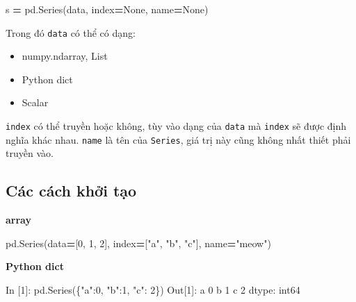 \documentclass[
]{book}
\newenvironment{Shaded}{\begin{snugshade}}{\end{snugshade}}
\newcommand{\DecValTok}[1]{\textcolor[rgb]{0.00,0.00,0.81}{#1}}
\newcommand{\NormalTok}[1]{#1}
\newcommand{\OperatorTok}[1]{\textcolor[rgb]{0.81,0.36,0.00}{\textbf{#1}}}
\newcommand{\StringTok}[1]{\textcolor[rgb]{0.31,0.60,0.02}{#1}}
\newcommand{\VariableTok}[1]{\textcolor[rgb]{0.00,0.00,0.00}{#1}}
\begin{document}
\begin{Shaded}
\begin{Highlighting}[]
\NormalTok{s }\OperatorTok{=}\NormalTok{ pd.Series(data, index}\OperatorTok{=}\VariableTok{None}\NormalTok{, name}\OperatorTok{=}\VariableTok{None}\NormalTok{)}
\end{Highlighting}
\end{Shaded}

Trong đó \texttt{data} có thể có dạng:

\begin{itemize}
\item
  numpy.ndarray, List
\item
  Python dict
\item
  Scalar
\end{itemize}

\texttt{index} có thể truyền hoặc không, tùy vào dạng của \texttt{data} mà \texttt{index} sẽ được định nghĩa khác nhau.
\texttt{name} là tên của \texttt{Series}, giá trị này cũng không nhất thiết phải truyền vào.

\hypertarget{cuxe1c-cuxe1ch-khux1edfi-tux1ea1o}{%
\subsection*{Các cách khởi tạo}\label{cuxe1c-cuxe1ch-khux1edfi-tux1ea1o}}

\textbf{array}

\begin{Shaded}
\begin{Highlighting}[]
\NormalTok{pd.Series(data}\OperatorTok{=}\NormalTok{[}\DecValTok{0}\NormalTok{, }\DecValTok{1}\NormalTok{, }\DecValTok{2}\NormalTok{], index}\OperatorTok{=}\NormalTok{[}\StringTok{"a"}\NormalTok{, }\StringTok{"b"}\NormalTok{, }\StringTok{"c"}\NormalTok{], name}\OperatorTok{=}\StringTok{"meow"}\NormalTok{)}
\end{Highlighting}
\end{Shaded}

\textbf{Python dict}

\begin{Shaded}
\begin{Highlighting}[]
\NormalTok{In [}\DecValTok{1}\NormalTok{]: pd.Series(\{}\StringTok{"a"}\NormalTok{:}\DecValTok{0}\NormalTok{, }\StringTok{"b"}\NormalTok{:}\DecValTok{1}\NormalTok{, }\StringTok{"c"}\NormalTok{: }\DecValTok{2}\NormalTok{\})}
\NormalTok{Out[}\DecValTok{1}\NormalTok{]: }
\NormalTok{a    }\DecValTok{0}
\NormalTok{b    }\DecValTok{1}
\NormalTok{c    }\DecValTok{2}
\NormalTok{dtype: int64}
\end{Highlighting}
\end{Shaded}
\end{document}
